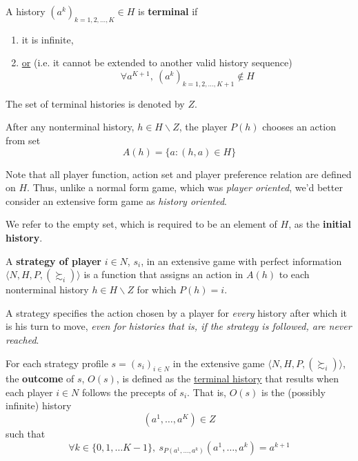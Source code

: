 \documentclass[11pt]{article}
\begin{document}
			\begin{definition}[pg.90]
				A history $(a^k)_{k=1,2,\dots,K} \in H$ is \textbf{terminal} if
				\begin{enumerate}
					\item it is infinite,
					\item \ul{or} (i.e. it cannot be extended to another valid history sequence)
					\[
						\forall a^{K+1},\ (a^k)_{k=1,2,\dots,K+1} \notin H
					\]
				\end{enumerate}
				The set of terminal histories is denoted by $Z$.
			\end{definition}
			
			\begin{notation}
				After any nonterminal history, $h \in H \backslash Z$, the player $P(h)$ chooses an action from set
				\[
					A(h) = \{a: (h, a) \in H\}
				\]
			\end{notation}
			
			\begin{remark}
				Note that all player function, action set and player preference relation are defined on $H$. Thus, unlike a normal form game, which was \emph{player oriented}, we'd better consider an extensive form game as \emph{history oriented}.
			\end{remark}
			
			\begin{definition}[pg.90]
				We refer to the empty set, which is required to be an element of $H$, as the \textbf{initial history}.
			\end{definition}
			
			\begin{definition}[92.1]
				A \textbf{strategy of player} $i \in N$, $s_i$, in an extensive game with perfect information $\langle N, H, P, (\succsim_i) \rangle$ is a function that assigns an action in $A(h)$ to each nonterminal history $h \in H \backslash Z$ for which $P(h) = i$.
			\end{definition}
			
			\begin{remark}[pg.92]
				A strategy specifies the action chosen by a player for \emph{every} history after which it is his turn to move, \emph{even for histories that is, if the strategy is followed, are never reached}.
			\end{remark}
			
			\begin{definition}[pg.93]
				For each strategy profile $s = (s_i)_{i \in N}$ in the extensive game $\langle N, H, P, (\succsim_i) \rangle$, the \textbf{outcome} of $s$, $O(s)$, is defined as the \ul{terminal history} that results when each player $i \in N$ follows the precepts of $s_i$. That is, $O(s)$ is the (possibly infinite) history
				\[
					(a^1, \dots, a^K) \in Z
				\]
				such that
				\[
					\forall k \in \{0, 1, \dots K-1\},\ s_{P(a^1, \dots, a^k)}(a^1, \dots, a^k) = a^{k+1}
				\]
			\end{definition}
			
\end{document}
